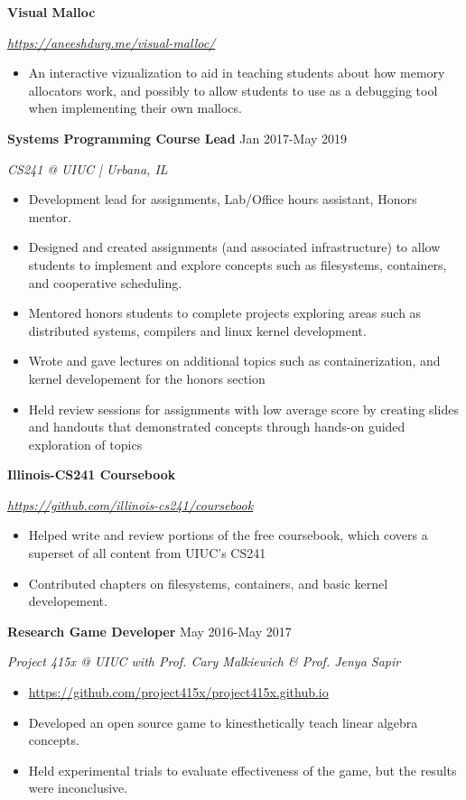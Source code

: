 \documentclass[paper=a4,fontsize=11pt]{scrartcl} %
\newcommand{\EducationEntry}[4]{
		\noindent \textbf{#1}     %
			\hfill#2 \par  %
		\noindent \textit{#3} \par        %
		\noindent\hangafter=0 \small #4 %
		\normalsize \par}
\begin{document}
\EducationEntry{Visual Malloc}{}{\url{https://aneeshdurg.me/visual-malloc/}} {
\begin{itemize}
\item An interactive vizualization to aid in teaching students about how memory allocators work, and possibly to allow students to use as a debugging tool when implementing their own mallocs.
\end{itemize}
}

\EducationEntry{Systems Programming Course Lead}{Jan 2017-May 2019}{CS241 @ UIUC | Urbana, IL}{
\begin{itemize}
  \item Development lead for assignments, Lab/Office hours assistant, Honors mentor.
  \item Designed and created assignments (and associated infrastructure) to allow students to implement and explore concepts such as filesystems, containers, and cooperative scheduling.
  \item Mentored honors students to complete projects exploring areas such as distributed systems, compilers and linux kernel development.
  \item Wrote and gave lectures on additional topics such as containerization, and kernel developement for the honors section
  \item Held review sessions for assignments with low average score by creating slides and handouts that demonstrated concepts through hands-on guided exploration of topics
\end{itemize}
}

\EducationEntry{Illinois-CS241 Coursebook}{}{\url{https://github.com/illinois-cs241/coursebook}}{
\begin{itemize}
  \item Helped write and review portions of the free coursebook, which covers a superset of all content from UIUC's CS241
  \item Contributed chapters on filesystems, containers, and basic kernel developement.
\end{itemize}
}

\EducationEntry{Research Game Developer}{May 2016-May 2017}{Project 415x @ UIUC with Prof. Cary Malkiewich \& Prof. Jenya Sapir}{
\begin{itemize}
\item \url{https://github.com/project415x/project415x.github.io}
\item Developed an open source game to kinesthetically teach linear algebra concepts.
\item Held experimental trials to evaluate effectiveness of the game, but the results were inconclusive.
\end{itemize}
}
\end{document}
